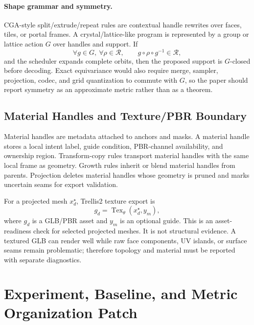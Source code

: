\paragraph{Shape grammar and symmetry.}
CGA-style split/extrude/repeat rules are contextual handle rewrites over faces,
tiles, or portal frames. A crystal/lattice-like program is represented by a
group or lattice action $G$ over handles and support. If
\begin{equation}
  \forall g\in G,\ \forall\rho\in\mathcal R,\qquad
  g\circ\rho\circ g^{-1}\in\mathcal R,
\end{equation}
and the scheduler expands complete orbits, then the proposed support is
$G$-closed before decoding. Exact equivariance would also require merge,
sampler, projection, codec, and grid quantization to commute with $G$, so the
paper should report symmetry as an approximate metric rather than as a theorem.

\subsection{Material Handles and Texture/PBR Boundary}

Material handles are metadata attached to anchors and masks. A material handle
stores a local intent label, guide condition, PBR-channel availability, and
ownership region. Transform-copy rules transport material handles with the same
local frame as geometry. Growth rules inherit or blend material handles from
parents. Projection deletes material handles whose geometry is pruned and marks
uncertain seams for export validation.

For a projected mesh $x_d^\star$, Trellis2 texture export is
\begin{equation}
  g_d=\operatorname{Tex}_{\theta}(x_d^\star,y_m),
\end{equation}
where $g_d$ is a GLB/PBR asset and $y_m$ is an optional guide. This is an
asset-readiness check for selected projected meshes. It is not structural
evidence. A textured GLB can render well while raw face components, UV islands,
or surface seams remain problematic; therefore topology and material must be
reported with separate diagnostics.

\section{Experiment, Baseline, and Metric Organization Patch}


